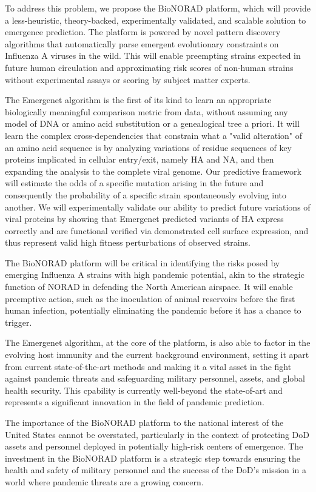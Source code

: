 \documentclass[onecolumn, compsoc,12pt]{IEEEtran}
\begin{document}
To address this problem, we propose the BioNORAD platform, which will provide a less-heuristic, theory-backed, experimentally validated, and scalable solution to emergence prediction. The platform is powered by novel pattern discovery algorithms that automatically parse emergent evolutionary constraints on Influenza A viruses in the wild. This will enable preempting strains expected in future human circulation and approximating risk scores of non-human strains without experimental assays or scoring by subject matter experts.

The Emergenet algorithm is the first of its kind to learn an appropriate biologically meaningful comparison metric from data, without assuming any model of DNA or amino acid substitution or a genealogical tree a priori. It will learn the complex cross-dependencies that constrain what a "valid alteration" of an amino acid sequence is by analyzing variations of residue sequences of key proteins implicated in cellular entry/exit, namely HA and NA, and then expanding the analysis to the complete viral genome. Our predictive framework will estimate the odds of a specific mutation arising in the future and consequently the probability of a specific strain spontaneously evolving into another. We will experimentally validate our ability to predict future variations of viral proteins by showing that Emergenet predicted variants of HA express correctly and are functional verified via demonstrated cell surface expression, and thus represent valid high fitness perturbations of observed strains.

The BioNORAD platform will be critical in identifying the risks posed by emerging Influenza A strains with high pandemic potential, akin to the strategic function of NORAD in defending the North American airspace. It will enable preemptive action, such as the inoculation of animal reservoirs before the first human infection, potentially eliminating the pandemic before it has a chance to trigger.

The Emergenet algorithm, at the core of the \bnd platform,  is also able to factor in the evolving host immunity and the current background environment, setting it apart from current state-of-the-art methods and making it a vital asset in the fight against pandemic threats and safeguarding military personnel, assets, and global health security. This cpability  is currently well-beyond the state-of-art and represents a significant innovation in the field of pandemic prediction.

The importance of the BioNORAD platform to the national interest of the United States cannot be overstated, particularly in the context of protecting DoD assets and personnel deployed in potentially high-risk centers of emergence. The investment in the BioNORAD platform is a strategic step towards ensuring the health and safety of military personnel and the success of the DoD's mission in a world where pandemic threats are a growing concern.
\end{document}
